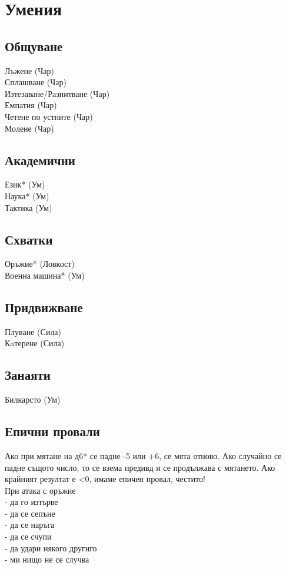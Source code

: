
\section{Умения}
\subsection{Общуване}
Лъжене (Чар)                      \\
Сплашване (Чар)                   \\
Изтезаване/Разпитване (Чар)       \\
Емпатия (Чар)                     \\
Четене по устните (Чар)           \\
Молене (Чар)                      \\

\subsection{Академични}
Език* (Ум)                        \\
Наука* (Ум)                       \\
Тактика (Ум)                      \\

\subsection{Схватки}
Оръжие* (Ловкост)                 \\
Военна машина* (Ум)               \\

\subsection{Придвижване}
Плуване (Сила)                    \\
Кaтерене (Сила)                   \\

\subsection{Занаяти}
Билкарсто (Ум)                    \\

\subsection{Епични провали}
Ако при мятане на д6* се падне -5 или +6, се мята отново.
Ако случайно се падне същото число, то се взема предивд и се продължава с мятането.
Ако крайният резултат е <0, имаме епичен провал, честито!  \\ 

При атака с оръжие           \\
- да го изтърве              \\
- да се сепъне               \\
- да се наръга               \\
- да се счупи                \\
- да удари някого другиго    \\
- ми нищо не се случва       \\

